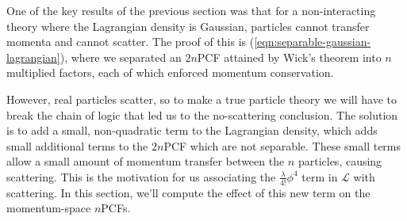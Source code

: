 One of the key results of the previous section was that for a non-interacting theory where the Lagrangian density is Gaussian, particles cannot transfer momenta and cannot scatter. The proof of this is (\ref{eqn:separable-gaussian-lagrangian}), where we separated an $2n$PCF attained by Wick's theorem into $n$ multiplied factors, each of which enforced momentum conservation.

However, real particles scatter, so to make a true particle theory we will have to break the chain of logic that led us to the no-scattering conclusion. The solution is to add a small, non-quadratic term to the Lagrangian density, which adds small additional terms to the $2n$PCF which are not separable. These small terms allow a small amount of momentum transfer between the $n$ particles, causing scattering. This is the motivation for us associating the $\frac{\lambda}{4!}\phi^4$ term in $\mathcal{L}$ with scattering. In this section, we'll compute the effect of this new term on the momentum-space $n$PCFs.

